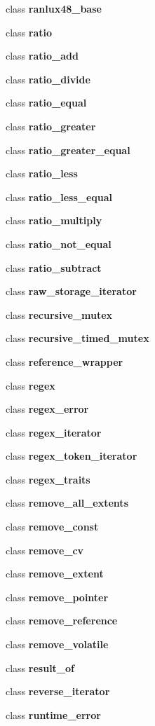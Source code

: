 \begin{DoxyCompactItemize}
\item 
class \textbf{ ranlux48\+\_\+base}
\item 
class \textbf{ ratio}
\item 
class \textbf{ ratio\+\_\+add}
\item 
class \textbf{ ratio\+\_\+divide}
\item 
class \textbf{ ratio\+\_\+equal}
\item 
class \textbf{ ratio\+\_\+greater}
\item 
class \textbf{ ratio\+\_\+greater\+\_\+equal}
\item 
class \textbf{ ratio\+\_\+less}
\item 
class \textbf{ ratio\+\_\+less\+\_\+equal}
\item 
class \textbf{ ratio\+\_\+multiply}
\item 
class \textbf{ ratio\+\_\+not\+\_\+equal}
\item 
class \textbf{ ratio\+\_\+subtract}
\item 
class \textbf{ raw\+\_\+storage\+\_\+iterator}
\item 
class \textbf{ recursive\+\_\+mutex}
\item 
class \textbf{ recursive\+\_\+timed\+\_\+mutex}
\item 
class \textbf{ reference\+\_\+wrapper}
\item 
class \textbf{ regex}
\item 
class \textbf{ regex\+\_\+error}
\item 
class \textbf{ regex\+\_\+iterator}
\item 
class \textbf{ regex\+\_\+token\+\_\+iterator}
\item 
class \textbf{ regex\+\_\+traits}
\item 
class \textbf{ remove\+\_\+all\+\_\+extents}
\item 
class \textbf{ remove\+\_\+const}
\item 
class \textbf{ remove\+\_\+cv}
\item 
class \textbf{ remove\+\_\+extent}
\item 
class \textbf{ remove\+\_\+pointer}
\item 
class \textbf{ remove\+\_\+reference}
\item 
class \textbf{ remove\+\_\+volatile}
\item 
class \textbf{ result\+\_\+of}
\item 
class \textbf{ reverse\+\_\+iterator}
\item 
class \textbf{ runtime\+\_\+error}
\item 

\end{DoxyCompactItemize}
